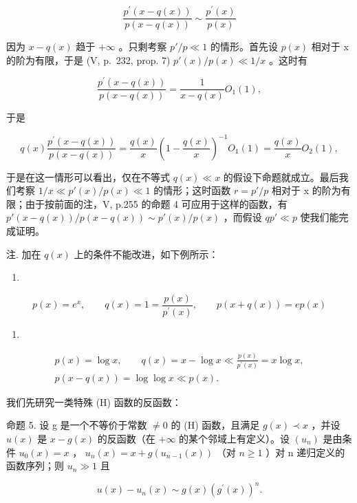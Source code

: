 \[
\frac {p ^ {\prime} (x - q (x))}{p (x - q (x))} \sim \frac {p ^ {\prime} (x)}{p (x)}
\]

因为 \(x - q(x)\) 趋于 \(+\infty\) 。只剩考察 \(p' / p \ll 1\) 的情形。首先设 \(p(x)\) 相对于 x 的阶为有限，于是 (V, p.~232, prop. 7) \(p'(x) / p(x) \ll 1 / x\) 。这时有

\[
\frac {p ^ {\prime} (x - q (x))}{p (x - q (x))} = \frac {1}{x - q (x)} O _ {1} (1),
\]

于是

\[
q (x) \frac {p ^ {\prime} (x - q (x))}{p (x - q (x))} = \frac {q (x)}{x} \left(1 - \frac {q (x)}{x}\right) ^ {- 1} O _ {1} (1) = \frac {q (x)}{x} O _ {2} (1),
\]

于是在这一情形可以看出，仅在不等式 \(q(x) \ll x\) 的假设下命题就成立。最后我们考察 \(1/x \ll p'(x)/p(x) \ll 1\) 的情形；这时函数 \(r = p'/p\) 相对于 x 的阶为有限；由于按前面的注，V, p.255 的命题 4 可应用于这样的函数，有 \(p'(x-q(x))/p(x-q(x)) \sim p'(x)/p(x)\) ，而假设 \(qp' \ll p\) 使我们能完成证明。

注. 加在 \(q(x)\) 上的条件不能改进，如下例所示：

\begin{enumerate}
\def\labelenumi{\alph{enumi})}
\tightlist
\item
\end{enumerate}

\[
p (x) = e ^ {x}, \qquad q (x) = 1 = \frac {p (x)}{p ^ {\prime} (x)}, \qquad p (x + q (x)) = e p (x)
\]

\begin{enumerate}
\def\labelenumi{\alph{enumi})}
\setcounter{enumi}{1}
\tightlist
\item
\end{enumerate}

\[
\begin{array}{c} p (x) = \log x, \qquad q (x) = x - \log x \ll \frac {p (x)}{p ^ {\prime} (x)} = x \log x, \\ p (x - q (x)) = \log \log x \ll p (x). \end{array}
\]

我们先研究一类特殊 (H) 函数的反函数：

命题 5. 设 g 是一个不等价于常数 \(\neq 0\) 的 (H) 函数，且满足 \(g(x) \prec x\) ，并设 \(u(x)\) 是 \(x - g(x)\) 的反函数（在 \(+\infty\) 的某个邻域上有定义）。设 \((u_n)\) 是由条件 \(u_0(x) = x\) ， \(u_n(x) = x + g(u_{n-1}(x))\) （对 \(n \geqslant 1\) ）对 n 递归定义的函数序列；则 \(u_n \gg 1\) 且

\[
u (x) - u _ {n} (x) \sim g (x) \left(g ^ {\prime} (x)\right) ^ {n}.\tag{11}
\]

